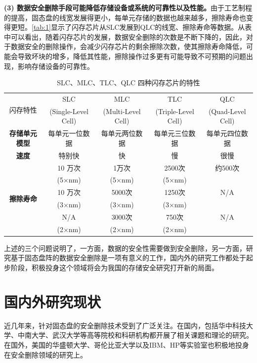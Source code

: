 \textbf{(3) 数据安全删除手段可能降低存储设备或系统的可靠性以及性能。}由于工艺制程的提高，固态盘的线宽发展得更小，每单元存储的数据也越来越多，擦除寿命也变得更短\cite{Yaakobi2012Characterization,Shibata2012A}。\autoref{tab:1}显示了闪存芯片从SLC发展到QLC的线宽、擦除寿命等数据。从表中可以看出，随着闪存芯片的发展，数据安全删除的次数是不断下降的，因此，对于数据安全的删除操作，会减少闪存芯片的剩余擦除次数，使其擦除寿命降低，可能会导致坏块的增多，降低其性能，擦除操作过多更有可能导致不可预期的问题出现，影响存储设备的可靠性。
\begin{table}
\centering
\caption{SLC、MLC、TLC、QLC 四种闪存芯片的特性}\label{tab:1}
    \begin{tabular}{|*{5}{c|}}
\hline
    \multirow{2}{*}{闪存特性} & SLC & MLC & TLC & QLC \\
    & (Single-Level Cell) & (Multi-Level Cell) & (Triple-Level Cell) & (Quad-Level Cell) \\
\hline
    \textbf{存储单元模型} & 每单元一位数据 & 每单元两位数据 & 每单元三位数据 & 每单元四位数据 \\
\hline
    \textbf{速度} & 特别快 & 快 & 慢 & 很慢 \\
\hline
    \multirow{6}{*}{\textbf{擦除寿命}} & 10 万次 & 1万次 & 2500次 & 约500次 \\ %
        & (5×nm) & (5×nm) & (5×nm) & \\ \cline{2-5}
    & 10 万次 & 5000次 & 1250次 & N/A \\%
        & (3×nm) & (3×nm) & (3×nm) &\\ \cline{2-5}
    & N/A & 3000次 & 750次 & N/A \\ %
        & (2×nm) & (2×nm) & (2×nm) & \\ \hline
\end{tabular}
\end{table}


上述的三个问题说明了，一方面，数据的安全性需要做到安全删除，另一方面，研究基于固态盘阵的数据安全删除是一项有意义的工作，国内外的研究工作都处于起步阶段，积极投身这个领域将会为我国的存储安全研究打开新的局面。

\section{国内外研究现状}
近几年来，针对固态盘的安全删除技术受到了广泛关注。在国内，包括华中科技大学、中南大学、武汉大学等高等院校和科研机构都开展了相关课题和理论的研究。在国外，美国的华盛顿大学、哥伦比亚大学以及IBM、HP等实验室也积极地投身在安全删除领域的研究上。
